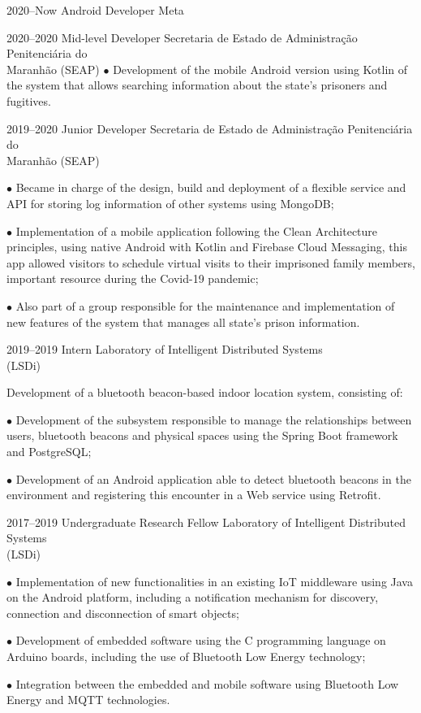 \documentclass[]{../document-class/twentysecondcv}
\begin{document}
\begin{twenty}
	\twentyitem
		{2020--Now}
		{Android Developer}
		{Meta}
		{}

	\twentyitem
		{2020--2020}
		{Mid-level Developer}
		{Secretaria de Estado de Administração Penitenciária do \\\hspace*{\fill}Maranhão (SEAP)}
		{
			$\bullet$ Development of the mobile Android version using Kotlin of the system that allows searching information about the state's prisoners and fugitives.
		}

	\twentyitem
		{2019--2020}
		{Junior Developer}
		{Secretaria de Estado de Administração Penitenciária do \\\hspace*{\fill}Maranhão (SEAP)}
		{
			$\bullet$ Became in charge of the design, build and deployment of a flexible service and API for storing log information of other systems using MongoDB;\vskip 4pt

			$\bullet$ Implementation of a mobile application following the Clean Architecture principles, using native Android with Kotlin and Firebase Cloud Messaging, this app allowed visitors to schedule virtual visits to their imprisoned family members, important resource during the Covid-19 pandemic;\vskip 4pt

			$\bullet$ Also part of a group responsible for the maintenance and implementation of new features of the system that manages all state's prison information.
		}
		
	\twentyitem
		{2019--2019}
		{Intern}
		{Laboratory of Intelligent Distributed Systems \\\hspace*{\fill}(LSDi)}
		{
			Development of a bluetooth beacon-based indoor location system, consisting of:\vskip 4pt

			$\bullet$ Development of the subsystem responsible to manage the relationships between users, bluetooth beacons and physical spaces using the Spring Boot framework and PostgreSQL;\vskip 4pt

			$\bullet$ Development of an Android application able to detect bluetooth beacons in the environment and registering this encounter in a Web service using Retrofit.
		}

	\twentyitem
		{2017--2019}
		{Undergraduate Research Fellow}
		{Laboratory of Intelligent Distributed Systems \\\hspace*{\fill}(LSDi)}
		{
			$\bullet$ Implementation of new functionalities in an existing IoT middleware using Java on the Android platform, including a notification mechanism for discovery, connection and disconnection of smart objects;\vskip 4pt 

			$\bullet$ Development of embedded software using the C programming language on Arduino boards, including the use of Bluetooth Low Energy technology;\vskip 4pt 

			$\bullet$ Integration between the embedded and mobile software using Bluetooth Low Energy and MQTT technologies.
		}
\end{twenty}
\end{document}
